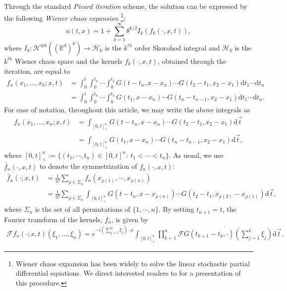 \documentclass[12pt]{report}
\theoremstyle{plain}
\theoremstyle{definition}
\numberwithin{equation}{section}
\newcommand{\R}{\mathbb{R}}
\newcommand{\ud}{\ensuremath{ \mathrm{d} }}
\begin{document}
Through the standard {\it Picard iteration} scheme, the solution can be expressed by the following
{\it Wiener chaos expansion} \footnote{Wiener chaos expansion has been widely to solve the linear
	stochastic partial differential equations. We direct interested readers to \cite[Section
	5]{balan.song:17:hyperbolic} for a presentation of this procedure.}:
\begin{equation} \label{E:solwexp}
u(t,x) = 1 + \sum_{k=1}^\infty \theta^{k/2}I_k(f_k(\cdot,x,t)),
\end{equation}
where $I_k : \mathcal{H}^{\otimes k}\left((\R^d)^k\right) \to \mathcal{H}_k$ is the $k^{th}$ order
Skorohod integral and $\mathcal{H}_k$ is the $k^{th}$ Wiener chaos space and the kernels
$f_k(\cdot,x,t)$, obtained through the iteration, are equal to
\begin{align*}
f_n(x_1,...,x_k;x,t)
& = \int_0^t \int_0^{t_n}\cdots \int_0^{t_2} G(t-t_n,x-x_n)\cdots G(t_2-t_1,x_2-x_1) \ud t_1\cdots \ud t_n \\
& = \int_0^t \int_0^{t_n}\cdots \int_0^{t_2} G(t_1,x-x_n)\cdots G(t_n-t_{n-1},x_2-x_1) \ud t_1\cdots \ud t_n. \nonumber
\end{align*}
For ease of notation, throughout this article, we may write the above integrals as
\begin{align*}
f_n(x_1,...,x_n;x,t)
& = \int_{[0,t]^n_<} G(t-t_n,x-x_n)\cdots G(t_2-t_1,x_2-x_1) \ud \vec{t} \\
& = \int_{[0,t]^n_<}G(t_1,x-x_n)\cdots G(t_n-t_{n-1},x_2-x_1) \ud \vec{t},
\end{align*}
where $[0,t]_<^n:=\{(t_1,\cdots,t_n)\in [0,t]^n:\: t_1<\cdots < t_n\}$. As usual, we use
$\widetilde{f_n}(\cdot, x, t)$ to denote the symmetrization of $f_n(\cdot,x,t)$:
\begin{align*}
\widetilde{f_n}(\cdot; x, t)
& = \frac{1}{n!} \sum_{\rho \in \Sigma_n} f_n\left(x_{\rho(1)},\cdots, x_{\rho(n)}\right) \\
& = \frac{1}{n!} \sum_{\rho \in \Sigma_n} \int_{[0,t]^n_<} G\left(t-t_n,x-x_{\rho(n)}\right)\cdots G\left(t_2-t_1,x_{\rho(2)}-x_{\rho(1)}\right) \ud \vec{t},
\end{align*}
where $\Sigma_n$ is the set of all permutations of $\{1,\cdots,n\} $.
By setting $t_{n+1}=t$, the Fourier transform of the kernels, $f_n$, is given by
\begin{align} \label{E:fweker}
\mathcal{F}f_n(\cdot;x,t)(\xi_1,...,\xi_n)
= e^{-i \left(\sum_{j=1}^n \xi_j \right) \cdot x} \int_{[0,t]^n_<}
\prod_{k=1}^n \overline{\mathcal{F}G(t_{k+1}-t_k,\cdot)\left(\sum_{j=1}^k \xi_j\right) } \ud \vec{t}.
\end{align}
\end{document}
